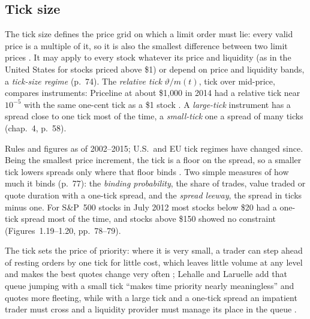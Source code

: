\subsection{Tick size}

\begin{qfdefinition}\label{def:tick-size}
 The tick size defines the price grid on which a limit order must lie: every valid price is a multiple of it, so it is also the smallest difference between two limit prices \citep[chap.~1, sec.~1.3.1, p.~74]{alpha-laruelle}. It may apply to every stock whatever its price and liquidity (as in the United States for stocks priced above \$1) or depend on price and liquidity bands, a \emph{tick-size regime} (p.~74). The \emph{relative tick} $\vartheta/m(t)$, tick over mid-price, compares instruments: Priceline at about \$1{,}000 in 2014 had a relative tick near $10^{-5}$ with the same one-cent tick as a \$1 stock \citep[chap.~3, sec.~3.1.5, pp.~48--49]{catalogue-0528}. A \emph{large-tick} instrument has a spread close to one tick most of the time, a \emph{small-tick} one a spread of many ticks (chap.~4, p.~58).

 Rules and figures as of 2002--2015; U.S.\ and EU tick regimes have changed since. Being the smallest price increment, the tick is a floor on the spread, so a smaller tick lowers spreads only where that floor binds \citep[chap.~1, sec.~1.3.2, p.~77]{alpha-laruelle}. Two simple measures of how much it binds (p.~77): the \emph{binding probability}, the share of trades, value traded or quote duration with a one-tick spread, and the \emph{spread leeway}, the spread in ticks minus one. For S\&P~500 stocks in July 2012 most stocks below \$20 had a one-tick spread most of the time, and stocks above \$150 showed no constraint (Figures~1.19--1.20, pp.~78--79).

 The tick sets the price of priority: where it is very small, a trader can step ahead of resting orders by one tick for little cost, which leaves little volume at any level and makes the best quotes change very often \citep[chap.~3, sec.~3.1.5, p.~49]{catalogue-0528}; Lehalle and Laruelle add that queue jumping with a small tick ``makes time priority nearly meaningless'' and quotes more fleeting, while with a large tick and a one-tick spread an impatient trader must cross and a liquidity provider must manage its place in the queue \citep[chap.~1, pp.~88--89]{alpha-laruelle}.


\end{qfdefinition}
